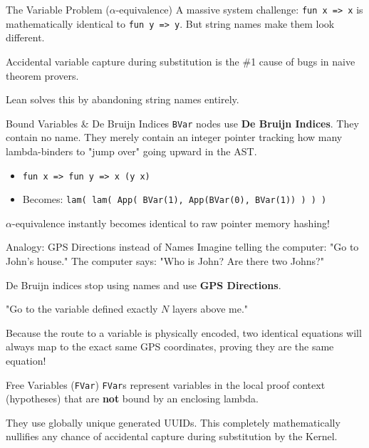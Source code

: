 \documentclass[10pt,aspectratio=169]{beamer}
\begin{document}
\begin{frame}[fragile]{The Variable Problem ($\alpha$-equivalence)}
    A massive system challenge: \verb|fun x => x| is mathematically identical to \verb|fun y => y|. But string names make them look different.
    
    Accidental variable capture during substitution is the \#1 cause of bugs in naive theorem provers.
    
    Lean solves this by abandoning string names entirely.
\end{frame}

\begin{frame}[fragile]{Bound Variables \& De Bruijn Indices}
    \verb|BVar| nodes use \textbf{De Bruijn Indices}. They contain no name. They merely contain an integer pointer tracking how many lambda-binders to "jump over" going upward in the AST.
    
    \begin{itemize}
        \item \verb|fun x => fun y => x (y x)|
        \item Becomes: \verb|lam( lam( App( BVar(1), App(BVar(0), BVar(1)) ) ) )|
    \end{itemize}
    
    $\alpha$-equivalence instantly becomes identical to raw pointer memory hashing!
\end{frame}

\begin{frame}[fragile]{Analogy: GPS Directions instead of Names}
    Imagine telling the computer: "Go to John's house." The computer says: "Who is John? Are there two Johns?"
    
    \vspace{1em}
    De Bruijn indices stop using names and use \textbf{GPS Directions}.
    
    \vspace{1em}
    "Go to the variable defined exactly $N$ layers above me." 
    
    Because the route to a variable is physically encoded, two identical equations will always map to the exact same GPS coordinates, proving they are the same equation!
\end{frame}

\begin{frame}[fragile]{Free Variables (\texttt{FVar})}
    \verb|FVar|s represent variables in the local proof context (hypotheses) that are \textbf{not} bound by an enclosing lambda.
    
    They use globally unique generated UUIDs. This completely mathematically nullifies any chance of accidental capture during substitution by the Kernel.
\end{frame}
\end{document}
